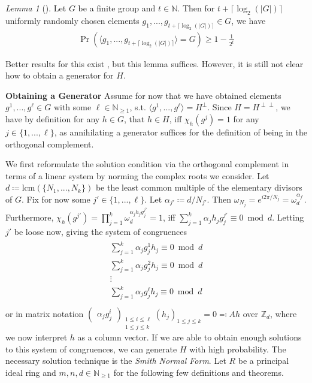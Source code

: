 \documentclass[10pt]{amsart}
\numberwithin{equation}{section}
\theoremstyle{definition}
\theoremstyle{remark}
\newtheorem{lemma}[theorem]{Lemma}
\begin{document}
    \begin{lemma}[{\cite[pp. 76-77]{Lomont}}] \label{randomly_chosen_group_generator_lemma}
        Let \(G\) be a finite group and \(t \in \mathbb{N}\). Then for \(t + \lceil \log_2(|G|) \rceil\) uniformly randomly chosen elements \(g_1, ..., g_{t + \lceil \log_2(|G|) \rceil} \in G\), we have
        \begin{align}
            \Pr(\langle g_1, ..., g_{t + \lceil \log_2(|G|) \rceil} \rangle = G) \geq 1-\frac{1}{2^t}
        \end{align}
    \end{lemma}

    Better results for this exist \cite[p. 77]{Lomont}, but this lemma suffices. However, it is still not clear how to obtain a generator for \(H\).

    \textbf{Obtaining a Generator} Assume for now that we have obtained elements \(g^1, ..., g^\ell \in G\) with some \(\ell \in \mathbb{N}_{\geq 1}\), s.t. \(\langle g^1, ..., g^\ell \rangle = H^\perp\). Since \(H = H^{\perp\perp}\), we have by definition for any \(h \in G\), that \(h \in H\), iff \(\chi_h(g^j) = 1\) for any \(j \in \{1, ..., \ell\}\), as annihilating a generator suffices for the definition of being in the orthogonal complement.

    We first reformulate the solution condition via the orthogonal complement in terms of a linear system by norming the complex roots we consider. Let \(d \coloneqq \text{lcm}(\{N_1, ..., N_k\})\) be the least common multiple of the elementary divisors of \(G\). Fix for now some \(j' \in \{1, ..., \ell\}\). Let \(\alpha_{j'} \coloneqq d/N_{j'}\). Then \(\omega_{N_j} = e^{i 2 \pi / N_j} = \omega_d^{\alpha_{j'}}\). Furthermore, \(\chi_h(g^{j'}) = \prod_{j=1}^k \omega_d^{\alpha_jh_jg_j^{j'}} = 1\), iff \(\sum_{j=1}^k \alpha_j h_j g_j^{j'} \equiv 0 \bmod d\). Letting \(j'\) be loose now, giving the system of congruences
    \begin{align}
        \begin{array}{c}
            \sum_{j=1}^k \alpha_j g_j^1 h_j \equiv 0 \bmod d\\
            \sum_{j=1}^k \alpha_j g_j^2 h_j \equiv 0 \bmod d\\
            \vdots\\
            \sum_{j=1}^k \alpha_j g_j^\ell h_j \equiv 0 \bmod d\\
        \end{array} \label{generator_recovery_soe}
    \end{align}
    or in matrix notation \(\begin{pmatrix}
        \alpha_jg_j^i
    \end{pmatrix}_{\substack{1 \leq i \leq \ell\\1 \leq j \leq k}} (h_j)_{1 \leq j \leq k} = 0 \eqqcolon Ah\) over \(\mathbb{Z}_d\), where we now interpret \(h\) as a column vector. If we are able to obtain enough solutions to this system of congruences, we can generate \(H\) with high probability. The necessary solution technique is the \emph{Smith Normal Form}. Let \(R\) be a principal ideal ring and \(m, n, d \in \mathbb{N}_{\geq 1}\) for the following few definitions and theorems.
\end{document}
